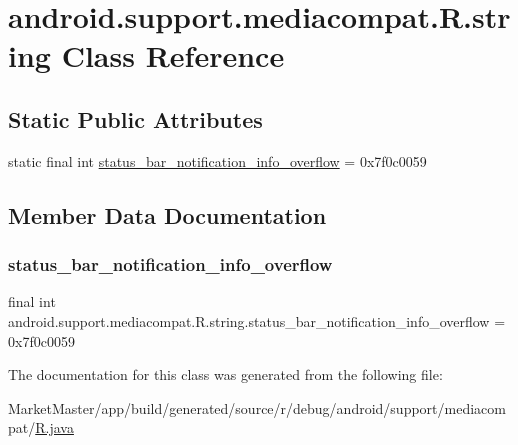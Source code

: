 \hypertarget{classandroid_1_1support_1_1mediacompat_1_1R_1_1string}{}\section{android.\+support.\+mediacompat.\+R.\+string Class Reference}
\label{classandroid_1_1support_1_1mediacompat_1_1R_1_1string}
\subsection*{Static Public Attributes}
\begin{DoxyCompactItemize}
\item 
static final int \mbox{\hyperlink{classandroid_1_1support_1_1mediacompat_1_1R_1_1string_a61a68d0b52b88ec2a9d2824d55d92090}{status\+\_\+bar\+\_\+notification\+\_\+info\+\_\+overflow}} = 0x7f0c0059
\end{DoxyCompactItemize}


\subsection{Member Data Documentation}
\mbox{\label{classandroid_1_1support_1_1mediacompat_1_1R_1_1string_a61a68d0b52b88ec2a9d2824d55d92090}} 
\subsubsection{\texorpdfstring{status\+\_\+bar\+\_\+notification\+\_\+info\+\_\+overflow}{status\_bar\_notification\_info\_overflow}}
{\footnotesize\ttfamily final int android.\+support.\+mediacompat.\+R.\+string.\+status\+\_\+bar\+\_\+notification\+\_\+info\+\_\+overflow = 0x7f0c0059\hspace{0.3cm}{\ttfamily [static]}}



The documentation for this class was generated from the following file\+:\begin{DoxyCompactItemize}
\item 
Market\+Master/app/build/generated/source/r/debug/android/support/mediacompat/\mbox{\hyperlink{debug_2android_2support_2mediacompat_2R_8java}{R.\+java}}\end{DoxyCompactItemize}
